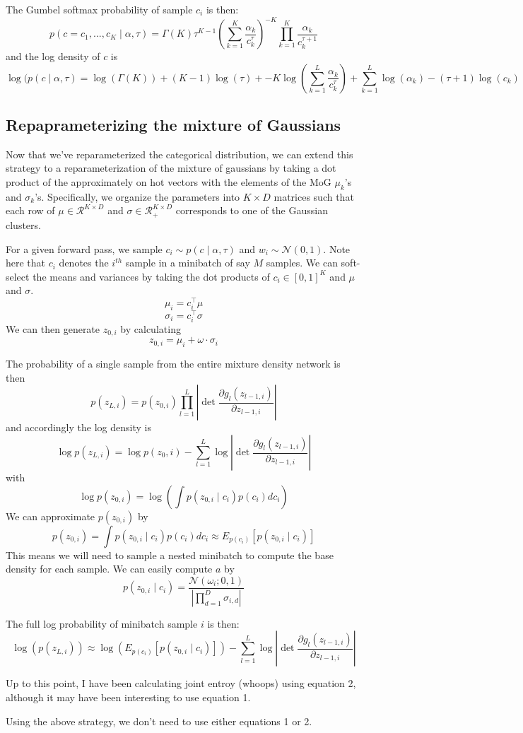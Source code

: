 \documentclass[11pt]{article}
\begin{document}
The Gumbel softmax probability of sample $c_i$ is then:
\[p(c = c_1, ..., c_K \mid \alpha, \tau) = \Gamma(K) \tau^{K-1} \left( \sum_{k=1}^K \frac{\alpha_k}{c_k^\tau} \right)^{-K} \prod_{k=1}^K \frac{\alpha_k}{c_k^{\tau + 1}} \]
and the log density of $c$ is
\begin{equation}
\log(p(c \mid \alpha, \tau) = \log (\Gamma (K)) + (K-1) \log(\tau) + -K \log \left( \sum_{k=1}^L \frac{\alpha_k}{c_k^\tau} \right)+ \sum_{k=1}^L \log(\alpha_k) - (\tau + 1) \log(c_k)
\end{equation}
\subsection{Repaprameterizing the mixture of Gaussians}
Now that we've reparameterized the categorical distribution, we can extend this strategy to a reparameterization of the mixture of gaussians by taking a dot product of the approximately on hot vectors with the elements of the MoG $\mu_k$'s and $\sigma_k$'s.  Specifically, we organize the parameters into $K \times D$ matrices such that each row of $\mu \in \mathcal{R}^{K \times D}$ and $\sigma \in \mathcal{R}^{K \times D}_+$ corresponds to one of the Gaussian clusters.

For a given forward pass, we sample $c_i \sim p(c \mid \alpha, \tau)$ and $w_i \sim \mathcal{N}(0, 1)$.  Note here that $c_i$ denotes the $i^{th}$ sample in a minibatch of say $M$ samples.  We can soft-select the means and variances by taking the dot products of $c_i \in [0,1]^K$ and $\mu$ and $\sigma$.
\[\mu_i = c_i^\top \mu \]
\[\sigma_i = c_i^\top \sigma \]
We can then generate $z_{0, i}$ by calculating
\[z_{0,i} = \mu_i + \omega \cdot \sigma_i \]

The probability of a single sample from the entire mixture density network is then
\[p(z_{L,i}) = p(z_{0,i})  \prod_{l=1}^L \left| \det \frac{\partial g_l(z_{l-1,i})}{\partial z_{l-1,i}} \right| \]
and accordingly the log density is
\[\log p(z_{L,i}) = \log p(z_0,i) - \sum_{l=1}^L \log \left| \det \frac{\partial g_l(z_{l-1,i})}{\partial z_{l-1,i}} \right| \]
with
\[\log p(z_{0,i}) = \log \left( \int p(z_{0,i} \mid c_i) p(c_i) d c_i \right) \]
We can approximate $p(z_{0,i})$ by
\[p(z_{0,i}) =  \int p(z_{0,i} \mid c_i) p(c_i) d c_i \approx E_{p(c_i)} \left[p(z_{0,i} \mid c_i) \right] \]
This means we will need to sample a nested minibatch to compute the base density for each sample.  We can easily compute $a$ by
 \[ p(z_{0,i} \mid c_i) = \frac{\mathcal{N}(\omega_i; 0, 1)}{\left| \prod_{d=1}^D \sigma_{i,d} \right|} \]

The full log probability of minibatch sample $i$ is then:
\[\log( p (z_{L,i})) \approx \log \left(  E_{p(c_i)} \left[p(z_{0,i} \mid c_i) \right] \right) - \sum_{l=1}^L \log \left| \det \frac{\partial g_l(z_{l-1,i})}{\partial z_{l-1,i}} \right| \]

Up to this point, I have been calculating joint entroy (whoops) using equation 2, although it may have been interesting to use equation 1.

Using the above strategy, we don't need to use either equations 1 or 2.



\end{document}
